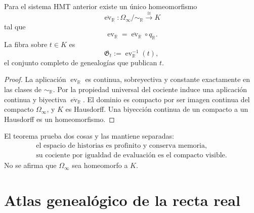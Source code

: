 \begin{theorem}
\label{p12-83-c18-s1:thm:homeomorfismo-cociente-compacto-u024}
Para el sistema HMT anterior existe un único homeomorfismo
\begin{equation}
 \overline{\operatorname{ev}}_{\mathbb R}:
 \Omega_\infty/\!\sim_{\mathbb R}
 \xrightarrow{\ \cong\ }K
 \label{p12-83-c18-s1:eq:homeomorfismo-cociente-compacto-u024}
\end{equation}
tal que
\begin{equation}
 \operatorname{ev}_{\mathbb R}
 =\overline{\operatorname{ev}}_{\mathbb R}\circ q_{\mathbb R}.
 \label{p12-83-c18-s1:eq:factorizacion-evaluacion-cociente}
\end{equation}
La fibra sobre \(t\in K\) es
\begin{equation}
 \mathfrak G_t
 :=\operatorname{ev}_{\mathbb R}^{-1}(t),
 \label{p12-83-c18-s1:eq:fibra-genealogias-mismo-valor}
\end{equation}
el conjunto completo de genealogías que publican \(t\).
\end{theorem}

\begin{proof}
La aplicación \(\operatorname{ev}_{\mathbb R}\) es continua, sobreyectiva y
constante exactamente en las clases de \(\sim_{\mathbb R}\). Por la
propiedad universal del cociente induce una aplicación continua y biyectiva
\(\overline{\operatorname{ev}}_{\mathbb R}\). El dominio es compacto por
ser imagen continua del compacto \(\Omega_\infty\), y \(K\) es Hausdorff.
Una biyección continua de un compacto a un Hausdorff es un homeomorfismo.
\end{proof}

El teorema prueba dos cosas y las mantiene separadas:
\begin{equation}
 \boxed{
 \begin{array}{c}
 \text{el espacio de historias es profinito y conserva memoria,}\\
 \text{su cociente por igualdad de evaluación es el compacto visible.}
 \end{array}}
 \label{p12-83-c18-s1:eq:dos-niveles-continuo-u024}
\end{equation}
No se afirma que \(\Omega_\infty\) sea homeomorfo a \(K\).

\section{Atlas genealógico de la recta real}

